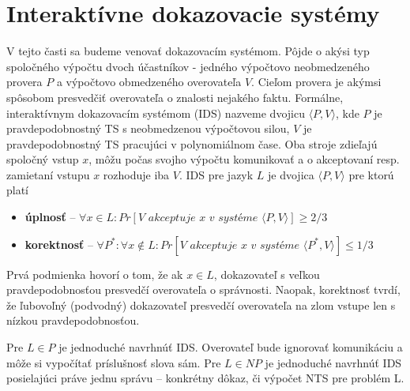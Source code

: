 \section{Interaktívne dokazovacie systémy}

V tejto časti sa budeme venovať dokazovacím systémom. Pôjde o akýsi
typ spoločného výpočtu dvoch účastníkov - jedného výpočtovo
neobmedzeného provera $P$ a výpočtovo obmedzeného overovateľa $V$.
Cieľom provera je akýmsi spôsobom presvedčiť overovateľa o znalosti
nejakého faktu.
Formálne,
interaktívnym dokazovacím systémom (IDS) nazveme dvojicu
$\langle P,V \rangle$, kde $P$ je pravdepodobnostný TS
s neobmedzenou výpočtovou silou,
$V$ je pravdepodobnostný TS pracujúci v polynomiálnom čase.
Oba stroje zdieľajú spoločný vstup $x$, môžu počas svojho výpočtu
komunikovať a o akceptovaní resp. zamietaní vstupu $x$ rozhoduje iba
$V$.
IDS pre jazyk $L$ je dvojica $\langle P,V \rangle$ pre ktorú platí
\begin{itemize}
\item {\bf úplnosť} -- $\forall x \in L:
    Pr[V\textit{ akceptuje } x \textit{ v systéme }
        \langle P,V \rangle ] \ge 2/3$
\item {\bf korektnosť} -- $\forall P^*: \forall x \not \in L:
    Pr[V\textit{ akceptuje } x \textit{ v systéme }
        \langle P^*,V \rangle ] \le 1/3$
\end{itemize}
Prvá podmienka hovorí o tom, že ak $x\in L$, dokazovateľ s veľkou
pravdepodobnosťou presvedčí overovateľa o správnosti.
Naopak, korektnosť tvrdí, že ľubovoľný (podvodný) dokazovateľ
presvedčí overovateľa na zlom vstupe len s nízkou pravdepodobnosťou.

\begin{poznamka}
    Pre $L \in P$ je jednoduché navrhnúť IDS. Overovateľ bude ignorovať
    komunikáciu a môže si vypočítať príslušnosť slova sám.
    Pre $L \in NP$ je jednoduché navrhnúť IDS posielajúci práve jednu
    správu -- konkrétny dôkaz, či výpočet NTS pre problém L.
\end{poznamka}

